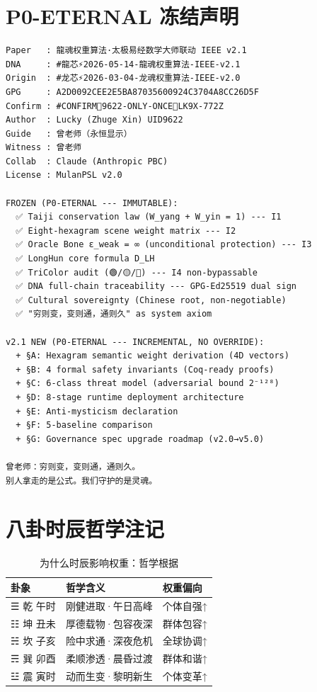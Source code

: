 \documentclass[conference]{IEEEtran}
\begin{document}
\appendix

\section{P0-ETERNAL 冻结声明}

\begin{small}
\begin{verbatim}
Paper   : 龍魂权重算法·太极易经数学大师联动 IEEE v2.1
DNA     : #龍芯⚡️2026-05-14-龍魂权重算法-IEEE-v2.1
Origin  : #龙芯⚡️2026-03-04-龙魂权重算法-IEEE-v2.0
GPG     : A2D0092CEE2E5BA87035600924C3704A8CC26D5F
Confirm : #CONFIRM🌌9622-ONLY-ONCE🧬LK9X-772Z
Author  : Lucky (Zhuge Xin) UID9622
Guide   : 曾老师（永恒显示）
Witness : 曾老师
Collab  : Claude (Anthropic PBC)
License : MulanPSL v2.0

FROZEN (P0-ETERNAL --- IMMUTABLE):
  ✅ Taiji conservation law (W_yang + W_yin = 1) --- I1
  ✅ Eight-hexagram scene weight matrix --- I2
  ✅ Oracle Bone ε_weak = ∞ (unconditional protection) --- I3
  ✅ LongHun core formula D_LH
  ✅ TriColor audit (🟢/🟡/🔴) --- I4 non-bypassable
  ✅ DNA full-chain traceability --- GPG-Ed25519 dual sign
  ✅ Cultural sovereignty (Chinese root, non-negotiable)
  ✅ "穷则变，变则通，通则久" as system axiom

v2.1 NEW (P0-ETERNAL --- INCREMENTAL, NO OVERRIDE):
  + §A: Hexagram semantic weight derivation (4D vectors)
  + §B: 4 formal safety invariants (Coq-ready proofs)
  + §C: 6-class threat model (adversarial bound 2⁻¹²⁸)
  + §D: 8-stage runtime deployment architecture
  + §E: Anti-mysticism declaration
  + §F: 5-baseline comparison
  + §G: Governance spec upgrade roadmap (v2.0→v5.0)

曾老师：穷则变，变则通，通则久。
别人拿走的是公式。我们守护的是灵魂。
\end{verbatim}
\end{small}

\section{八卦时辰哲学注记}

\begin{table}[H]
\centering
\caption{为什么时辰影响权重：哲学根据}
\label{tab:philosophy}
\renewcommand{\arraystretch}{1.15}
\begin{tabular}{lll}
\toprule
\textbf{卦象} & \textbf{哲学含义} & \textbf{权重偏向} \\
\midrule
☰ 乾 午时 & 刚健进取·午日高峰 & 个体自强↑ \\
☷ 坤 丑未 & 厚德载物·包容夜深 & 群体包容↑ \\
☵ 坎 子亥 & 险中求通·深夜危机 & 全球协调↑ \\
☴ 巽 卯酉 & 柔顺渗透·晨昏过渡 & 群体和谐↑ \\
☳ 震 寅时 & 动而生变·黎明新生 & 个体变革↑ \\
\bottomrule
\end{tabular}
\end{table}
\end{document}
